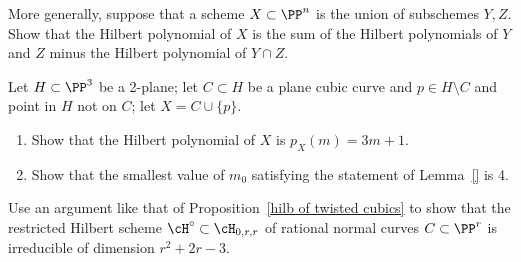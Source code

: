 \begin{exercise}
More generally, suppose that a scheme $X\subset \PP^n$ is the union of subschemes $Y,Z$. Show that the Hilbert polynomial of
$X$ is the sum of the Hilbert polynomials of $Y$ and $Z$ minus the Hilbert polynomial of $Y\cap Z$. 
\end{exercise}


\begin{exercise}
Let $H \subset \PP^3$ be a 2-plane; let $C \subset H$ be a plane cubic curve and $p \in H \setminus C$ and point in $H$ not on $C$; let $X = C \cup \{p\}$.
\begin{enumerate}
\item Show that the Hilbert polynomial of $X$ is $p_X(m) = 3m+1$.
\item Show that the smallest value of $m_0$ satisfying the statement of Lemma~\ref{} is 4.
\end{enumerate}
\end{exercise}

\begin{exercise}\label{rational normal hilbert}
Use an  argument like that of Proposition~\ref{hilb of twisted cubics} to show that the restricted Hilbert scheme $\cH^\circ \subset \cH_{0,r,r}$ of rational normal curves $C \subset \PP^r$ is irreducible of dimension $r^2+2r-3$.
\end{exercise}


